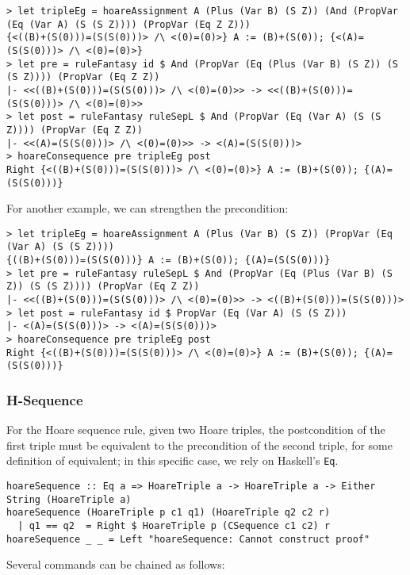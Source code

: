 \documentclass{article}
\begin{document}
\begin{lstlisting}
> let tripleEg = hoareAssignment A (Plus (Var B) (S Z)) (And (PropVar (Eq (Var A) (S (S Z)))) (PropVar (Eq Z Z)))
{<((B)+(S(0)))=(S(S(0)))> /\ <(0)=(0)>} A := (B)+(S(0)); {<(A)=(S(S(0)))> /\ <(0)=(0)>}
> let pre = ruleFantasy id $ And (PropVar (Eq (Plus (Var B) (S Z)) (S (S Z)))) (PropVar (Eq Z Z))
|- <<((B)+(S(0)))=(S(S(0)))> /\ <(0)=(0)>> -> <<((B)+(S(0)))=(S(S(0)))> /\ <(0)=(0)>>
> let post = ruleFantasy ruleSepL $ And (PropVar (Eq (Var A) (S (S Z)))) (PropVar (Eq Z Z))
|- <<(A)=(S(S(0)))> /\ <(0)=(0)>> -> <(A)=(S(S(0)))>
> hoareConsequence pre tripleEg post
Right {<((B)+(S(0)))=(S(S(0)))> /\ <(0)=(0)>} A := (B)+(S(0)); {(A)=(S(S(0)))}
\end{lstlisting}

For another example, we can strengthen the precondition:

\begin{lstlisting}
> let tripleEg = hoareAssignment A (Plus (Var B) (S Z)) (PropVar (Eq (Var A) (S (S Z))))
{((B)+(S(0)))=(S(S(0)))} A := (B)+(S(0)); {(A)=(S(S(0)))}
> let pre = ruleFantasy ruleSepL $ And (PropVar (Eq (Plus (Var B) (S Z)) (S (S Z)))) (PropVar (Eq Z Z))
|- <<((B)+(S(0)))=(S(S(0)))> /\ <(0)=(0)>> -> <((B)+(S(0)))=(S(S(0)))>
> let post = ruleFantasy id $ PropVar (Eq (Var A) (S (S Z)))
|- <(A)=(S(S(0)))> -> <(A)=(S(S(0)))>
> hoareConsequence pre tripleEg post
Right {<((B)+(S(0)))=(S(S(0)))> /\ <(0)=(0)>} A := (B)+(S(0)); {(A)=(S(S(0)))}
\end{lstlisting}

\subsubsection{H-Sequence}

For the Hoare sequence rule, given two Hoare triples, the postcondition of the first triple must be equivalent to the precondition of the second triple, for some definition of equivalent; in this specific case, we rely on Haskell's \texttt{Eq}.

\begin{lstlisting}
hoareSequence :: Eq a => HoareTriple a -> HoareTriple a -> Either String (HoareTriple a)
hoareSequence (HoareTriple p c1 q1) (HoareTriple q2 c2 r)
  | q1 == q2  = Right $ HoareTriple p (CSequence c1 c2) r
hoareSequence _ _ = Left "hoareSequence: Cannot construct proof"
\end{lstlisting}

Several commands can be chained as follows:
\end{document}
